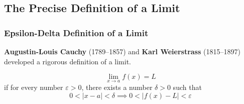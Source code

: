 \subsection{The Precise Definition of a Limit}

\subsubsection{Epsilon-Delta Definition of a Limit}
\textbf{Augustin-Louis Cauchy} (1789--1857) and \textbf{Karl Weierstrass}
(1815--1897) developed a rigorous definition of a limit.
\begin{definition}
    \[\lim_{x\to a}f(x)=L\] if for every number \(\varepsilon>0\), there exists a
    number \(\delta>0\) such that \[0<|x-a|<\delta\implies 0<|f(x)-L|<\varepsilon\]
\end{definition}